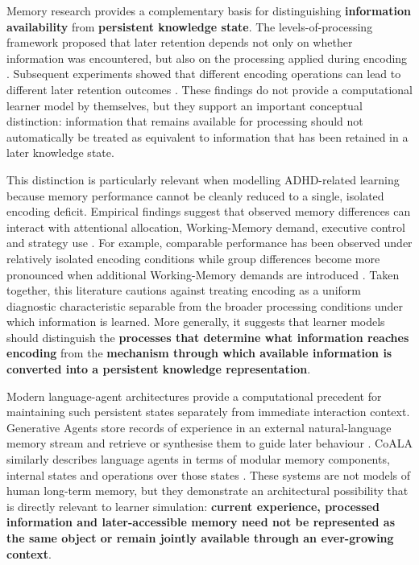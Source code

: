 Memory research provides a complementary basis for distinguishing \textbf{information availability} from \textbf{persistent knowledge state}. The levels-of-processing framework proposed that later retention depends not only on whether information was encountered, but also on the processing applied during encoding \cite{craik1972levels}. Subsequent experiments showed that different encoding operations can lead to different later retention outcomes \cite{craik1975depth}. These findings do not provide a computational learner model by themselves, but they support an important conceptual distinction: information that remains available for processing should not automatically be treated as equivalent to information that has been retained in a later knowledge state.

This distinction is particularly relevant when modelling ADHD-related learning because memory performance cannot be cleanly reduced to a single, isolated encoding deficit. Empirical findings suggest that observed memory differences can interact with attentional allocation, Working-Memory demand, executive control and strategy use \cite{kofler2020working,ortega2020neurocognitive,Lundervold2019VerbalMF,laine2025role}. For example, comparable performance has been observed under relatively isolated encoding conditions while group differences become more pronounced when additional Working-Memory demands are introduced \cite{kofler2020working}. Taken together, this literature cautions against treating encoding as a uniform diagnostic characteristic separable from the broader processing conditions under which information is learned. More generally, it suggests that learner models should distinguish the \textbf{processes that determine what information reaches encoding} from the \textbf{mechanism through which available information is converted into a persistent knowledge representation}.

Modern language-agent architectures provide a computational precedent for maintaining such persistent states separately from immediate interaction context. Generative Agents store records of experience in an external natural-language memory stream and retrieve or synthesise them to guide later behaviour \cite{park-etal-2023-generative}. CoALA similarly describes language agents in terms of modular memory components, internal states and operations over those states \cite{sumers-etal-2024-cognitive}. These systems are not models of human long-term memory, but they demonstrate an architectural possibility that is directly relevant to learner simulation: \textbf{current experience, processed information and later-accessible memory need not be represented as the same object or remain jointly available through an ever-growing context}.

